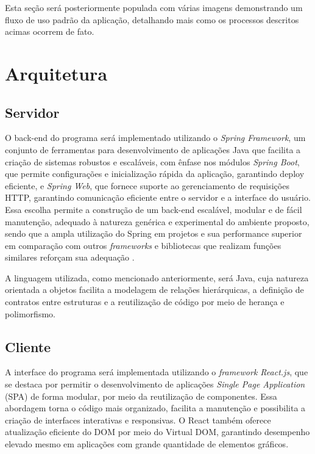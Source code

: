 Esta seção será posteriormente populada com várias imagens demonstrando um fluxo de uso padrão da aplicação, detalhando mais como os processos descritos acimas ocorrem de fato.

\section{Arquitetura}

\subsection{Servidor}
O back-end do programa será implementado utilizando o \textit{Spring Framework}, um conjunto de ferramentas para desenvolvimento de aplicações Java que facilita a criação de sistemas robustos e escaláveis, com ênfase nos módulos \textit{Spring Boot}, que permite configurações e inicialização rápida da aplicação, garantindo deploy eficiente, e \textit{Spring Web}, que fornece suporte ao gerenciamento de requisições HTTP, garantindo comunicação eficiente entre o servidor e a interface do usuário. Essa escolha permite a construção de um back-end escalável, modular e de fácil manutenção, adequado à natureza genérica e experimental do ambiente proposto, sendo que a ampla utilização do Spring em projetos e sua performance superior em comparação com outros \textit{frameworks} e bibliotecas que realizam funções similares reforçam sua adequação \cite{springboot-why}.

A linguagem utilizada, como mencionado anteriormente, será Java, cuja natureza orientada a objetos facilita a modelagem de relações hierárquicas, a definição de contratos entre estruturas e a reutilização de código por meio de herança e polimorfismo.

\subsection{Cliente}
A interface do programa será implementada utilizando o \textit{framework React.js}, que se destaca por permitir o desenvolvimento de aplicações \textit{Single Page Application} (SPA) de forma modular, por meio da reutilização de componentes. Essa abordagem torna o código mais organizado, facilita a manutenção e possibilita a criação de interfaces interativas e responsivas. O React também oferece atualização eficiente do DOM por meio do Virtual DOM, garantindo desempenho elevado mesmo em aplicações com grande quantidade de elementos gráficos. 

